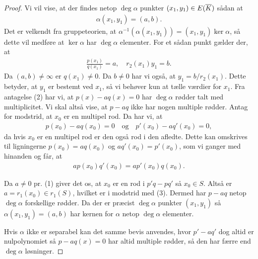 \begin{proof}
Vi vil vise, at der findes netop $\deg \alpha$ punkter $(x_1, y_1) \in E(\overline{K})$ sådan at
\begin{align*}
	\alpha (x_1, y_1) = (a, b).
\end{align*} 
Det er velkendt fra gruppeteorien, at $\alpha^{-1}(\alpha(x_1, y_1)) = (x_1, y_1) 
\ker \alpha$, så dette vil medføre at $\ker \alpha$ har $\deg \alpha$ elementer.
For et sådan punkt gælder der, at 
\begin{align*}
	\frac{p(x_1)}{q(x_1)} = a, \quad r_2(x_1) y_1 = b.
\end{align*}
Da $(a, b) \neq \infty$ er $q(x_1) \neq 0$. %
Da $b \neq 0$ har vi også, at $y_1 = b / r_2(x_1)$. Dette betyder, at $y_1$ er bestemt
ved $x_1$, så vi behøver kun at tælle værdier for $x_1$. Fra antagelse (2) har vi, at 
$p(x) - aq(x) = 0$ har $\deg \alpha$ rødder talt med multiplicitet. Vi skal altså vise,
at $p-aq$ ikke har nogen multiple rødder. Antag for modstrid, at $x_0$ er en multipel
rod. Da har vi, at
\begin{align*}
	p(x_0) - aq(x_0) = 0 \quad \text{og} \quad p'(x_0) - aq'(x_0) = 0,
\end{align*}
da hvis $x_0$ er en multipel rod er den også rod i den afledte.
Dette kan omskrives til ligningerne $p(x_0)=aq(x_0)$ og $aq'(x_0)=p'(x_0)$, 
som vi ganger med hinanden og får, at 
\begin{align*}
	a p(x_0)q'(x_0) = ap'(x_0)q(x_0).
\end{align*} 

Da $a \neq 0$ pr. (1) giver det os, at $x_0$ er en rod i $p'q-pq'$ så $x_0 \in S$.
Altså er $a=r_1(x_0) \in r_1(S)$, hvilket er i modstrid med (3). Dermed har 
$p-aq$ netop $\deg \alpha$ forskellige rødder. Da der er præcist $\deg \alpha$ 
punkter $(x_1, y_1)$ så $\alpha(x_1, y_1) = (a, b)$ har kernen for $\alpha$ netop
$\deg \alpha$ elementer. 

Hvis $\alpha$ ikke er separabel kan det samme bevis anvendes, hvor $p'-aq'$ dog altid er nulpolynomiet så $p-aq(x)=0$ har altid multiple rødder, så den har færre end $\deg \alpha$ løsninger.
\end{proof}

